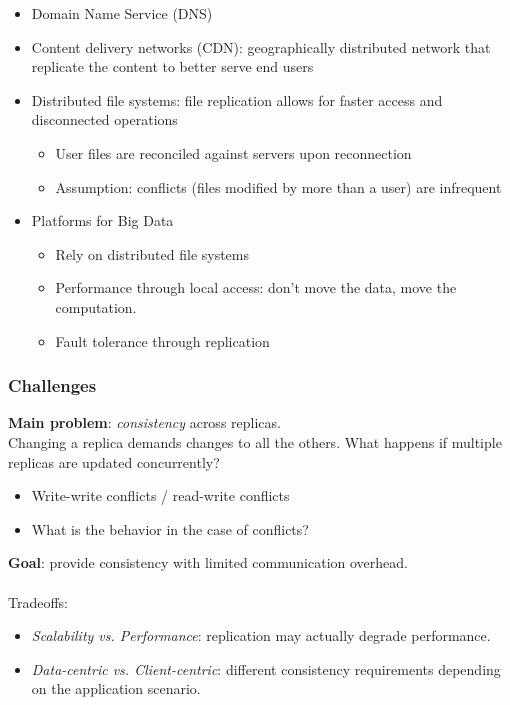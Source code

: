 \documentclass[10pt,a4paper]{article}
\begin{document}
\begin{itemize}
	\item Domain Name Service (DNS)
	\item Content delivery networks (CDN): geographically distributed network that replicate the content to better serve end users
	\item Distributed file systems: file replication allows for faster access and disconnected operations
	\begin{itemize}
		\item User files are reconciled against servers upon reconnection
		\item Assumption: conflicts (files modified by more than a user) are infrequent
	\end{itemize}
	\item Platforms for Big Data
	\begin{itemize}
		\item Rely on distributed file systems
		\item Performance through local access: don't move the data, move the computation.
		\item Fault tolerance through replication
	\end{itemize}
\end{itemize}
\subsubsection{Challenges}
\textbf{Main problem}: \textit{consistency} across replicas. \\ Changing a replica demands changes to all the others. What happens if multiple replicas are updated concurrently?
\begin{itemize}
	\item Write-write conflicts / read-write conflicts
	\item What is the behavior in the case of conflicts?
\end{itemize}
\textbf{Goal}: provide consistency with limited communication overhead. \\ \\
Tradeoffs:
\begin{itemize}
 \item \textit{Scalability vs. Performance}: replication may actually degrade performance.
 \item \textit{Data-centric vs. Client-centric}: different consistency requirements depending on the application scenario.
\end{itemize}
\end{document}
